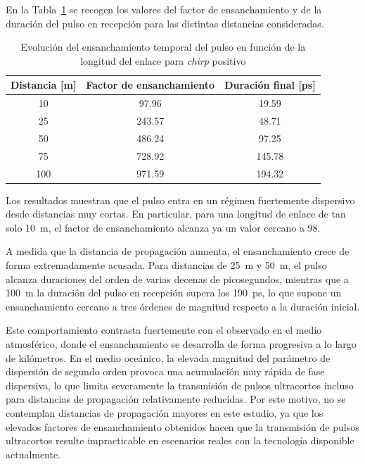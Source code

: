 En la Tabla~\ref{tabla_oceano_distancia_disp} se recogen los valores del factor de ensanchamiento y de la duración del pulso en recepción para las distintas distancias consideradas.

\begin{table}[H]
\centering
\renewcommand{\arraystretch}{1.2}
\begin{tabular}{|c|c|c|}
\hline
\textbf{Distancia [m]} & \textbf{Factor de ensanchamiento} & \textbf{Duración final [ps]} \\
\hline
10  & 97.96  & 19.59 \\
25  & 243.57 & 48.71 \\
50  & 486.24 & 97.25 \\
75  & 728.92 & 145.78 \\
100 & 971.59 & 194.32 \\
\hline
\end{tabular}
\caption{ Evolución del ensanchamiento temporal del pulso en función de la longitud del enlace
para \textit{chirp} positivo}
\label{tabla_oceano_distancia_disp}
\end{table}

Los resultados muestran que el pulso entra en un régimen fuertemente dispersivo desde distancias muy cortas. En particular, para una longitud de enlace de tan solo \SI{10}{\meter}, el factor de ensanchamiento alcanza ya un valor cercano a 98.

A medida que la distancia de propagación aumenta, el ensanchamiento crece de forma extremadamente acusada. Para distancias de \SI{25}{\meter} y \SI{50}{\meter}, el pulso alcanza duraciones del orden de varias decenas de picosegundos, mientras que a \SI{100}{\meter} la duración del pulso en recepción supera los \SI{190}{\pico\second}, lo que supone un ensanchamiento cercano a tres órdenes de magnitud respecto a la duración inicial.

Este comportamiento contrasta fuertemente con el observado en el medio atmosférico, donde el ensanchamiento se desarrolla de forma progresiva a lo largo de kilómetros. En el medio oceánico, la elevada magnitud del parámetro de dispersión de segundo orden provoca una acumulación muy rápida de fase dispersiva, lo que limita severamente la transmisión de pulsos ultracortos incluso para distancias de propagación relativamente reducidas. Por este motivo, no se contemplan distancias de propagación mayores en este estudio, ya que los elevados factores de ensanchamiento obtenidos hacen que la transmisión de pulsos ultracortos resulte impracticable en escenarios reales con la tecnología disponible actualmente.


